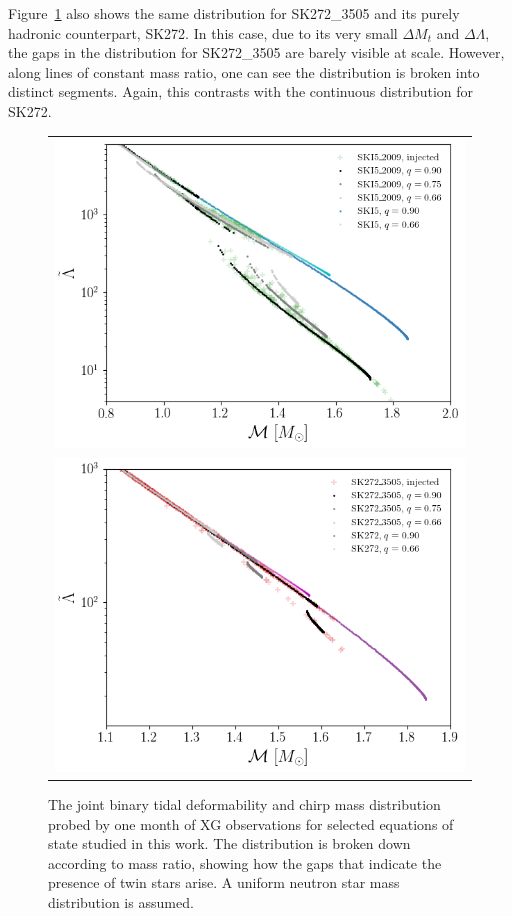 \documentclass[aps,prd,twocolumn,superscriptaddress,nofootinbib]{revtex4-1}
\begin{document}
Figure~\ref{fig:lambdapop2} also shows the same distribution for SK272\_3505 and its purely hadronic counterpart, SK272. In this case, due to its very small $\Delta M_t$ and $\Delta\Lambda$, the gaps in the distribution for SK272\_3505 are barely visible at scale. However, along lines of constant mass ratio, one can see the distribution is broken into distinct segments. Again, this contrasts with the continuous distribution for SK272.

\begin{figure}[t]
    \begin{tabular}{c}
      \includegraphics[width=0.95\columnwidth]{SKI52009_sm.png} \\
      \includegraphics[width=0.95\columnwidth]{SK2723505_sm.png}
    \end{tabular}
    \caption{The joint binary tidal deformability and chirp mass distribution probed by one month of XG observations for selected equations of state studied in this work. The distribution is broken down according to mass ratio, showing how the gaps that indicate the presence of twin stars arise. A uniform neutron star mass distribution is assumed.}
    \label{fig:lambdapop2}
\end{figure}
\end{document}
